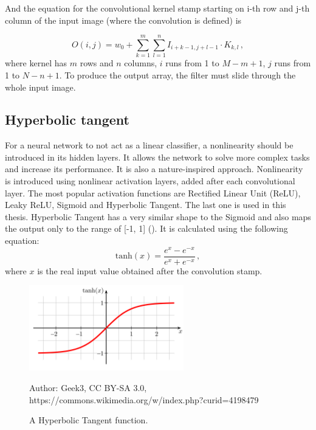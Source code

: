 And the equation for the convolutional kernel stamp starting on i-th row and j-th column of the input image (where the convolution is defined) is

\begin{equation}
	O(i, j) = w_0 + \sum\limits_{k=1}^m \sum\limits_{l=1}^n I_{i+k-1, j+l-1}\cdot K_{k, l} \,,
\end{equation}
where kernel has $m$ rows and $n$ columns, $i$ runs from 1 to $M-m+1$, $j$ runs from 1 to $N-n+1$. To produce the output array, the filter must slide through the whole input image.


\subsection{Hyperbolic tangent}

For a neural network to not act as a linear classifier, a nonlinearity should be introduced in its hidden layers. It allows the network to solve more complex tasks and increase its performance. It is also a nature-inspired approach. Nonlinearity is introduced using nonlinear activation layers, added after each convolutional layer. The most popular activation functions are Rectified Linear Unit (ReLU), Leaky ReLU, Sigmoid and Hyperbolic Tangent. The last one is used in this thesis. Hyperbolic Tangent has a very similar shape to the Sigmoid and also maps the output only to the range of [-1, 1] (). It is calculated using the following equation:
\begin{equation}
	\textrm{tanh}(x) = \frac{e^x-e^{-x}}{e^x+e^{-x}}\,,
\end{equation}
where $x$ is the real input value obtained after the convolution stamp.

\begin{figure}[!h]
  \centering
  \includegraphics[width=0.6\textwidth]{./fig/photos/hyperbolic_tangent.png}

  \caption{A Hyperbolic Tangent function.}
  Author: Geek3, CC BY-SA 3.0, https://commons.wikimedia.org/w/index.php?curid=4198479
  \label{fig:htangent}
\end{figure}


